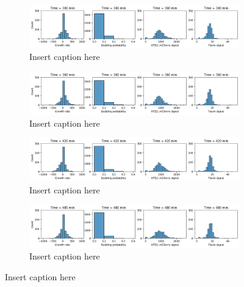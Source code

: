 \begin{figure}
  \centering
  \begin{subfigure}[htpb]{0.9\textwidth}
   \centering
   \includegraphics[width=\textwidth]{613_distribs_0300}
   \caption{
     Insert caption here
   }
   \label{fig:biology-kdeficient-distribs-0300}
  \end{subfigure}

  \begin{subfigure}[htpb]{0.9\textwidth}
   \centering
   \includegraphics[width=\textwidth]{613_distribs_0360}
   \caption{
     Insert caption here
   }
   \label{fig:biology-kdeficient-distribs-0360}
  \end{subfigure}

  \begin{subfigure}[htpb]{0.9\textwidth}
   \centering
   \includegraphics[width=\textwidth]{613_distribs_0420}
   \caption{
     Insert caption here
   }
   \label{fig:biology-kdeficient-distribs-0420}
  \end{subfigure}

  \begin{subfigure}[htpb]{0.9\textwidth}
   \centering
   \includegraphics[width=\textwidth]{613_distribs_0480}
   \caption{
     Insert caption here
   }
   \label{fig:biology-kdeficient-distribs-0480}
  \end{subfigure}


\end{figure}

